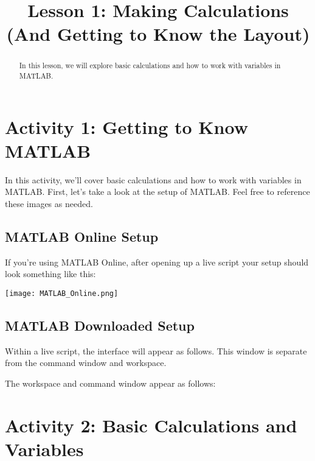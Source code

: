\documentclass{ximera}
\title{Lesson 1: Making Calculations (And Getting to Know the Layout)}
\begin{document}
\begin{abstract}
In this lesson, we will explore basic calculations and how to work with variables in MATLAB.
\end{abstract}
\maketitle

\section*{Activity 1: Getting to Know MATLAB}

In this activity, we'll cover basic calculations and how to work with variables in MATLAB. 
First, let's take a look at the setup of MATLAB. Feel free to reference these images as needed.

\subsection*{MATLAB Online Setup}

If you're using MATLAB Online, after opening up a live script your setup should look something like this:

\begin{center}
    \texttt{[image: MATLAB\_Online.png]}
\end{center}

\subsection*{MATLAB Downloaded Setup}

Within a live script, the interface will appear as follows. This window is separate from the command window and workspace.


The workspace and command window appear as follows:


\section*{Activity 2: Basic Calculations and Variables}
\end{document}
